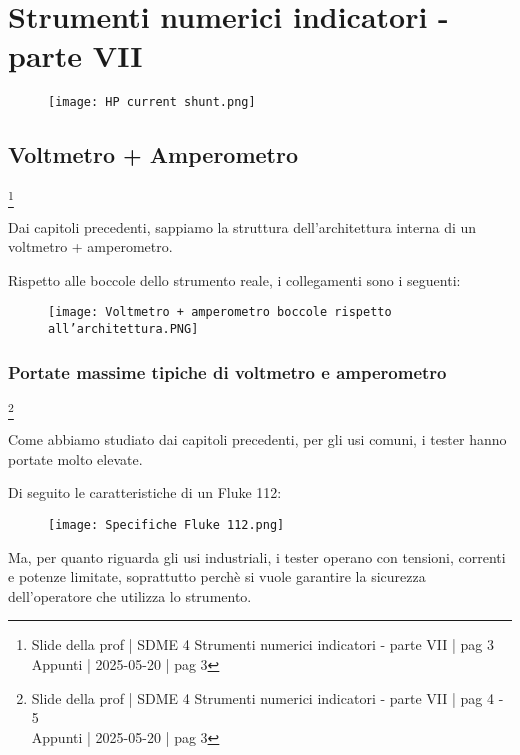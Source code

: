\chapter{Strumenti numerici indicatori - parte VII}

\begin{figure}[h]
    \centering
    \texttt{[image: HP current shunt.png]}
\end{figure}

\newpage    

\section{Voltmetro + Amperometro}
\footnote{Slide della prof | SDME 4 Strumenti numerici indicatori - parte VII | pag 3 \\  
Appunti | 2025-05-20 | pag 3 }

Dai capitoli precedenti, sappiamo la struttura dell'architettura interna di un voltmetro + amperometro. \newline 

Rispetto alle boccole dello strumento reale, i collegamenti sono i seguenti: 

\begin{figure}[h]
    \centering
    \texttt{[image: Voltmetro + amperometro boccole rispetto all'architettura.PNG]}
\end{figure}

\newpage 

\subsection{Portate massime tipiche di voltmetro e amperometro}
\footnote{Slide della prof | SDME 4 Strumenti numerici indicatori - parte VII | pag 4 - 5\\  
Appunti | 2025-05-20 | pag 3 }

Come abbiamo studiato dai capitoli precedenti, per gli usi comuni, i tester hanno portate molto elevate. \newline 

Di seguito le caratteristiche di un Fluke 112: 

\begin{figure}[h]
    \centering
    \texttt{[image: Specifiche Fluke 112.png]}
\end{figure}

Ma, per quanto riguarda gli usi industriali, i tester operano con tensioni, correnti e potenze limitate, soprattutto perchè si vuole garantire la sicurezza 
dell'operatore che utilizza lo strumento. \newline 

